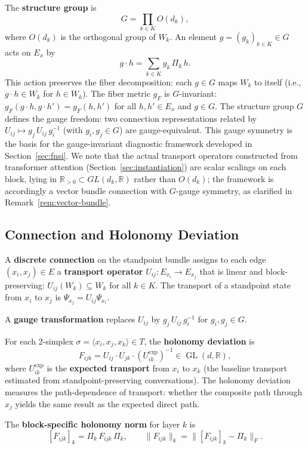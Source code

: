 \begin{definition}
\label{def:structure-group}
The \textbf{structure group} is
\[
    G = \prod_{k \in K} O(d_k),
\]
where $O(d_k)$ is the orthogonal group of $W_k$. An element $g = (g_k)_{k \in K} \in G$
acts on $E_x$ by
\[
    g \cdot h = \sum_{k \in K} g_k\, \Pi_k\, h.
\]
This action preserves the fiber decomposition: each $g \in G$ maps $W_k$ to itself (i.e.,
$g \cdot h \in W_k$ for $h \in W_k$). The fiber metric $g_F$ is $G$-invariant:
$g_F(g \cdot h, g \cdot h') = g_F(h, h')$ for all $h, h' \in E_x$ and $g \in G$.
The structure group $G$ defines the gauge freedom: two connection representations
related by $U_{ij} \mapsto g_j\, U_{ij}\, g_i^{-1}$ (with $g_i, g_j \in G$) are
gauge-equivalent. This gauge symmetry is the basis for the gauge-invariant
diagnostic framework developed in Section~\ref{sec:fnsi}. We note that the actual
transport operators constructed from transformer attention
(Section~\ref{sec:instantiation}) are scalar scalings on each block, lying in
$\mathbb{R}_{>0} \subset GL(d_k, \mathbb{R})$ rather than $O(d_k)$; the framework
is accordingly a vector bundle connection with $G$-gauge symmetry, as clarified in
Remark~\ref{rem:vector-bundle}.
\end{definition}

\subsection{Connection and Holonomy Deviation}
\label{sec:connection-abstract}

\begin{definition}[Connection]
\label{def:connection}
A \textbf{discrete connection} on the standpoint bundle assigns to each edge $(x_i, x_j)
\in E$ a \textbf{transport operator} $U_{ij} : E_{x_i} \to E_{x_j}$ that is linear and
block-preserving: $U_{ij}(W_k) \subseteq W_k$ for all $k \in K$. The transport of a
standpoint state from $x_i$ to $x_j$ is $\Psi_{x_j} = U_{ij} \Psi_{x_i}$.

A \textbf{gauge transformation} replaces $U_{ij}$ by $g_j\, U_{ij}\, g_i^{-1}$ for
$g_i, g_j \in G$.
\end{definition}

\begin{definition}
\label{def:curvature-abstract}
For each 2-simplex $\sigma = \langle x_i, x_j, x_k \rangle \in T$, the \textbf{holonomy
deviation} is
\[
    F_{ijk} = U_{ij} \cdot U_{jk} \cdot (U_{ik}^{\exp})^{-1} \in \operatorname{GL}(d,
    \mathbb{R}),
\]
where $U_{ik}^{\exp}$ is the \textbf{expected transport} from $x_i$ to $x_k$ (the
baseline transport estimated from standpoint-preserving conversations). The holonomy
deviation measures the path-dependence of transport: whether the composite path through
$x_j$ yields the same result as the expected direct path.

The \textbf{block-specific holonomy norm} for layer $k$ is
\[
    [F_{ijk}]_k = \Pi_k\, F_{ijk}\, \Pi_k, \qquad
    \|F_{ijk}\|_k = \|[F_{ijk}]_k - \Pi_k\|_F.
\]
\end{definition}


